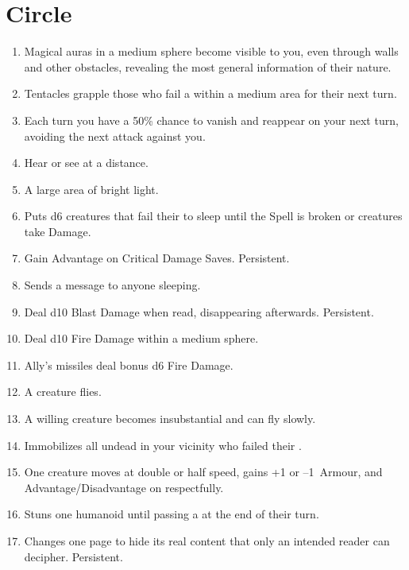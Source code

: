 \documentclass[itdr]{subfiles}
\begin{document}
\section{ Circle}
\def \spellcircle {3}
\begin{enumerate}
	\item {} Magical auras in a medium sphere become visible to you, even through walls and other obstacles, revealing the most general information of their nature.
	\item {} Tentacles grapple those who fail a  within a medium area for their next turn.
	\item {} Each turn you have a 50\% chance to vanish and reappear on your next turn, avoiding the next attack against you.
	\item {} Hear or see at a distance.
	\item {} A large area of bright light.
	\item {} Puts d6 creatures that fail their  to sleep until the Spell is broken or creatures take Damage.
	\item {} Gain Advantage on Critical Damage Saves. Persistent.
	\item {} Sends a message to anyone sleeping.
	\item {} Deal d10 Blast Damage when read, disappearing afterwards. Persistent.
	\item {} Deal d10 Fire Damage within a medium sphere.
	\item {} Ally's missiles deal bonus d6 Fire Damage.
	\item {} A creature flies.
	\item {} A willing creature becomes insubstantial and can fly slowly.
	\item {} Immobilizes all undead in your vicinity who failed their .
	\item {} One creature moves at double or half speed, gains +1 or --1~Armour, and Advantage/Disadvantage on  respectfully.
	\item {} Stuns one humanoid until passing a  at the end of their turn.
	\item {} Changes one page to hide its real content that only an intended reader can decipher. Persistent.

\end{enumerate}
\end{document}
